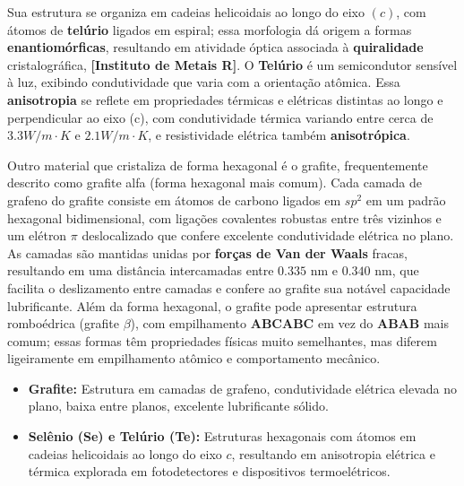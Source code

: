\documentclass[10pt,twocolumn,letterpaper]{article}
\begin{document}
\hspace{1cm} Sua estrutura se organiza em cadeias helicoidais ao longo do eixo $(c)$, com átomos de \textbf{telúrio} ligados em espiral; essa morfologia dá origem a formas \textbf{enantiomórficas}, resultando em atividade óptica associada à \textbf{quiralidade} cristalográfica, \textbf{[Instituto de Metais R]}. O \textbf{Telúrio} é um semicondutor sensível à luz, exibindo condutividade que varia com a orientação atômica. Essa \textbf{anisotropia} se reflete em propriedades térmicas e elétricas distintas ao longo e perpendicular ao eixo (c), com condutividade térmica variando entre cerca de $3.3 W/m\cdot K$ e $2.1 W/m\cdot K$, e resistividade elétrica também \textbf{anisotrópica}. 

\hspace{1cm} Outro material que cristaliza de forma hexagonal é o grafite, frequentemente descrito como grafite alfa (forma hexagonal mais comum). Cada camada de grafeno do grafite consiste em átomos de carbono ligados em $sp^2$ em um padrão hexagonal bidimensional, com ligações covalentes robustas entre três vizinhos e um elétron $\pi$ deslocalizado que confere excelente condutividade elétrica no plano. As camadas são mantidas unidas por \textbf{forças de Van der Waals} fracas, resultando em uma distância intercamadas entre $0.335$ nm e $0.340$ nm, que facilita o deslizamento entre camadas e confere ao grafite sua notável capacidade lubrificante. Além da forma hexagonal, o grafite pode apresentar estrutura romboédrica (grafite $\beta$), com empilhamento \textbf{ABCABC} em vez do \textbf{ABAB} mais comum; essas formas têm propriedades físicas muito semelhantes, mas diferem ligeiramente em empilhamento atômico e comportamento mecânico.


\begin{itemize}
    \item \textbf{\color{primaryBlue}Grafite:} Estrutura em camadas de grafeno, condutividade elétrica elevada no plano, baixa entre planos, excelente lubrificante sólido.
    \item \textbf{\color{primaryBlue}Selênio (Se) e Telúrio (Te):} Estruturas hexagonais com átomos em cadeias helicoidais ao longo do eixo \(c\), resultando em anisotropia elétrica e térmica explorada em fotodetectores e dispositivos termoelétricos.
\end{itemize}
\end{document}
